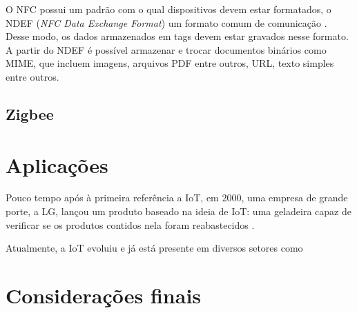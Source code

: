 \documentclass[
	article,			%
	11pt,				%
	oneside,			%
	a4paper,			%
	section=TITLE,		%
	subsection=TITLE,	%
	english,			%
	brazil,				%
	sumario=tradicional
	]{abntex2}
\begin{document}
O NFC possui um padrão com o qual dispositivos devem estar formatados, o NDEF (\textit{NFC Data 
Exchange Format}) um formato comum de comunicação \cite{brianjepsondoncolemantomigoe2014}. Desse 
modo, os dados 
armazenados em tags devem estar gravados nesse formato. A partir do NDEF é possível 
armazenar e trocar documentos binários como MIME, que incluem imagens, arquivos PDF entre outros, 
URL, texto simples entre outros.







\subsection{Zigbee}


\section{Aplicações}

Pouco tempo após à primeira referência a IoT, em 2000, uma empresa de grande porte, a LG, lançou 
um produto baseado na ideia de IoT: uma geladeira capaz de verificar se os produtos contidos nela 
foram reabastecidos \cite{survey-suresh}.



Atualmente, a IoT evoluiu e já está presente em diversos setores como 





% 

\section*{Considerações finais}







\end{document}
